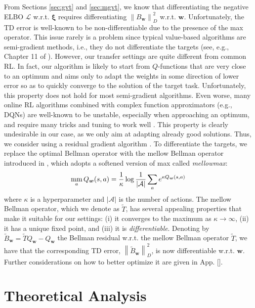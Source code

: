 \documentclass{article}
\newcommand{\mm}{\operatornamewithlimits{mm}}
\newcommand{\wt}[1]{\widetilde{#1}}
\newcommand{\norm}[1]{\left\lVert #1 \right\rVert}
\begin{document}
From Sections \ref{sec:gvt} and \ref{sec:mgvt}, we know that differentiating the negative ELBO $\mathcal{L}$ w.r.t. $\bm{\xi}$ requires differentiating $\norm{B_{\bm{w}}}_D^2$ w.r.t. $\bm{w}$. Unfortunately, the TD error is well-known to be non-differentiable due to the presence of the max operator. This issue rarely is a problem since typical value-based algorithms are semi-gradient methods, i.e., they do not differentiate the targets (see, e.g., Chapter 11 of \cite{sutton1998reinforcement}). However, our transfer settings are quite different from common RL. In fact, our algorithm is likely to start from $Q$-functions that are very close to an optimum and aims only to adapt the weights in some direction of lower error so as to quickly converge to the solution of the target task. Unfortunately, this property does not hold for most semi-gradient algorithms. Even worse, many online RL algorithms combined with complex function approximators (e.g., DQNs) are well-known to be unstable, especially when approaching an optimum, and require many tricks and tuning to work well \cite{schaul2015prioritized,van2016deep}. This property is clearly undesirable in our case, as we only aim at adapting already good solutions. Thus, we consider using a residual gradient algorithm \cite{baird1995residual}. To differentiate the targets, we replace the optimal Bellman operator with the mellow Bellman operator introduced in \cite{asadi2017alternative}, which adopts a softened version of max called \textit{mellowmax}:
\begin{equation}
\mm_a Q_{\bm{w}}(s,a) = \frac{1}{\kappa} \log \frac{1}{|\mathcal{A}|}\sum_a e^{\kappa Q_{\bm{w}}(s,a)}
\end{equation}
where $\kappa$ is a hyperparameter and $|\mathcal{A}|$ is the number of actions. The mellow Bellman operator, which we denote as $\wt{T}$, has several appealing properties that make it suitable for our settings: (i) it converges to the maximum as $\kappa \rightarrow \infty$, (ii) it has a unique fixed point, and (iii) it is \textit{differentiable}. Denoting by $\wt{B}_{\bm{w}} = \wt{T}Q_{\bm{w}} - Q_{\bm{w}}$ the Bellman residual w.r.t. the mellow Bellman operator $\wt{T}$, we have that the corresponding TD error, $\norm{\wt{B}_{\bm{w}}}_D^2$, is now differentiable w.r.t. $\bm{w}$. Further considerations on how to better optimize it are given in App. \ref{}.

\section{Theoretical Analysis}\label{sec:theory}
\end{document}
